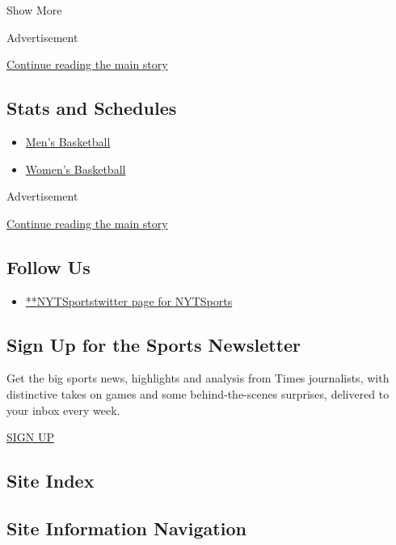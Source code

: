 Show More

Advertisement

\protect\hyperlink{after-mid1}{Continue reading the main story}

\hypertarget{stats-and-schedules}{%
\subsection{Stats and Schedules}\label{stats-and-schedules}}

\begin{itemize}
\tightlist
\item
  \protect\hyperlink{}{Men's Basketball}
\item
  \protect\hyperlink{}{Women's Basketball}
\end{itemize}

Advertisement

\protect\hyperlink{after-mktg}{Continue reading the main story}

\hypertarget{follow-us}{%
\subsection{Follow Us}\label{follow-us}}

\begin{itemize}
\tightlist
\item
  \href{https://twitter.com/NYTSports}{**NYTSportstwitter page for
  NYTSports}
\end{itemize}

\hypertarget{sign-up-for-the-sports-newsletter}{%
\subsection{Sign Up for the Sports
Newsletter}\label{sign-up-for-the-sports-newsletter}}

Get the big sports news, highlights and analysis from Times journalists,
with distinctive takes on games and some behind-the-scenes surprises,
delivered to your inbox every week.

\href{/newsletters/signup/SP}{SIGN UP}

\hypertarget{site-index}{%
\subsection{Site Index}\label{site-index}}

\hypertarget{site-information-navigation}{%
\subsection{Site Information
Navigation}\label{site-information-navigation}}

